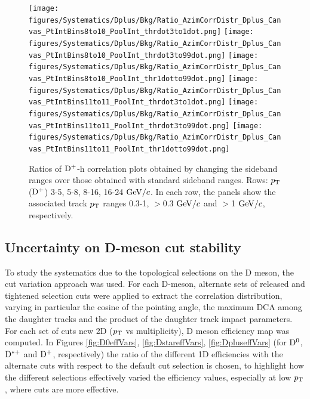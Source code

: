 \begin{figure}
{\texttt{[image: figures/Systematics/Dplus/Bkg/Ratio\_AzimCorrDistr\_Dplus\_Canvas\_PtIntBins8to10\_PoolInt\_thrdot3to1dot.png]}}
{\texttt{[image: figures/Systematics/Dplus/Bkg/Ratio\_AzimCorrDistr\_Dplus\_Canvas\_PtIntBins8to10\_PoolInt\_thrdot3to99dot.png]}}
{\texttt{[image: figures/Systematics/Dplus/Bkg/Ratio\_AzimCorrDistr\_Dplus\_Canvas\_PtIntBins8to10\_PoolInt\_thr1dotto99dot.png]}}
{\texttt{[image: figures/Systematics/Dplus/Bkg/Ratio\_AzimCorrDistr\_Dplus\_Canvas\_PtIntBins11to11\_PoolInt\_thrdot3to1dot.png]}}
{\texttt{[image: figures/Systematics/Dplus/Bkg/Ratio\_AzimCorrDistr\_Dplus\_Canvas\_PtIntBins11to11\_PoolInt\_thrdot3to99dot.png]}}
{\texttt{[image: figures/Systematics/Dplus/Bkg/Ratio\_AzimCorrDistr\_Dplus\_Canvas\_PtIntBins11to11\_PoolInt\_thr1dotto99dot.png]}}
 \caption{Ratios of ${\rm D^+}$-h correlation plots obtained by changing the sideband ranges over those obtained with standard sideband ranges. Rows: $p_{\rm T}$(${\rm D^+}$) 3-5, 5-8, 8-16, 16-24 $\mathrm{GeV}/c$. In each row, the panels show the associated track $p_{\rm T}$ ranges 0.3-1, $>$0.3 $\mathrm{GeV}/c$ and $>$1 $\mathrm{GeV}/c$, respectively.}
\label{fig:Syst_DplusBkg}
\end{figure}

\subsection{Uncertainty on D-meson cut stability}
To study the systematics due to the topological selections on the D meson, the cut variation approach was used. For each D-meson, alternate sets of released and tightened selection cuts were applied to extract the correlation distribution, varying in particular the cosine of the pointing angle, the maximum DCA among the daughter tracks and the product of the daughter track impact parameters. For each set of cuts new 2D ($p_{\rm T}$ vs multiplicity), D meson efficiency map was computed.
In Figures \ref{fig:D0effVars}, \ref{fig:DstareffVars}, \ref{fig:DpluseffVars} (for ${\rm D^0}$, ${\rm D^{*+}}$ and ${\rm D^+}$, respectively) the ratio of the different 1D efficiencies with the alternate cuts with respect to the default cut selection is chosen, to highlight how the different selections effectively varied the efficiency values, especially at low $p_{\rm T}$, where cuts are more effective.

